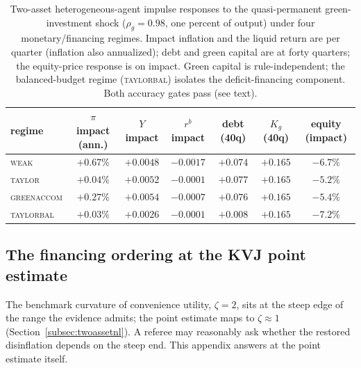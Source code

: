 \documentclass[12pt]{article}
\begin{document}
\begin{table}[!htb]
\centering
\caption{Two-asset heterogeneous-agent impulse responses to the
quasi-permanent green-investment shock ($\rho_g=0.98$, one percent of
output) under four monetary/financing regimes. Impact inflation and the
liquid return are per quarter (inflation also annualized); debt and green
capital are at forty quarters; the equity-price response is on impact.
Green capital is rule-independent; the balanced-budget regime
(\textsc{taylorbal}) isolates the deficit-financing component. Both accuracy
gates pass (see text).}
\label{tab:twoasset}
\footnotesize
\setlength{\tabcolsep}{4pt}
\begin{tabular}{lcccccc}
\toprule
regime & $\pi$ impact (ann.) & $Y$ impact & $r^b$ impact & debt (40q) & $K_g$ (40q) & equity (impact) \\
\midrule
\textsc{weak}       & $+0.67\%$ & $+0.0048$ & $-0.0017$ & $+0.074$ & $+0.165$ & $-6.7\%$ \\
\textsc{taylor}     & $+0.04\%$ & $+0.0052$ & $-0.0001$ & $+0.077$ & $+0.165$ & $-5.2\%$ \\
\textsc{greenaccom} & $+0.27\%$ & $+0.0054$ & $-0.0007$ & $+0.076$ & $+0.165$ & $-5.4\%$ \\
\textsc{taylorbal}  & $+0.03\%$ & $+0.0026$ & $-0.0001$ & $+0.008$ & $+0.165$ & $-7.2\%$ \\
\bottomrule
\end{tabular}
\end{table}

\subsection{The financing ordering at the KVJ point estimate}
\label{subsec:zten}

The benchmark curvature of convenience utility, $\zeta = 2$, sits at the
steep edge of the range the \citet{krishnamurthy2012} evidence admits; the
point estimate maps to $\zeta \approx 1$
(Section~\ref{subsec:twoassetnl}). A referee may reasonably ask whether the
restored disinflation depends on the steep end. This appendix answers at
the point estimate itself.
\end{document}
